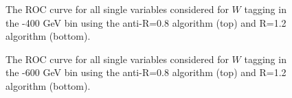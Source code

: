 \begin{figure}
\begin{center}
\caption{The ROC curve for all single variables considered for $W$
tagging in the -400 GeV bin using the anti-\kT R=0.8 algorithm
(top) and R=1.2 algorithm (bottom).}
\label{fig:pt300_single}
\end{center}
\end{figure}


\begin{figure}
\begin{center}
\caption{The ROC curve for all single variables considered for $W$
tagging in the -600 GeV bin using the anti-\kT R=0.8 algorithm
(top) and R=1.2 algorithm (bottom).}
\label{fig:pt500_single}
\end{center}
\end{figure}

